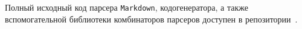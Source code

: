 Полный исходный код парсера \lstinline{Markdown}, кодогенератора, а также вспомогательной библиотеки комбинаторов парсеров доступен в репозитории~\cite{mdParse}. 

\printbibliography[heading=bibintoc%
]



